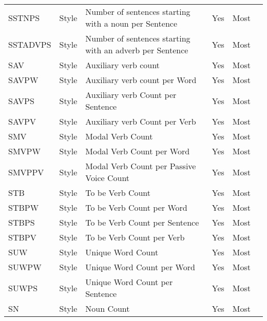 \begin{longtable}{l l m{} c c m{}}
    SSTNPS & Style & Number of sentences starting with a noun per Sentence & Yes & Most & \cite{Bassani2019_lr359} \\
    SSTADVPS & Style & Number of sentences starting with an adverb per Sentence & Yes & Most & \cite{Bassani2019_lr359} \\
    SAV & Style & Auxiliary verb count & Yes & Most & \cite{Dalip2009_lr14, Wang2020_lr26, Wang2019_lr74, Bassani2019_lr359, Dalip2016_lr1002, Dalip2011_lr1003, Dalip2014_lr1004, Olcer2022_lr2017, Magalhaes2019_lr2028} \\
    SAVPW & Style & Auxiliary verb count per Word & Yes & Most & \cite{Anderka2012_lr17, Ferretti2012_lr115, Pereyra2019_lr147, Bassani2019_lr359} \\
    SAVPS & Style & Auxiliary verb Count per Sentence & Yes & Most & \cite{Bassani2019_lr359} \\
    SAVPV & Style & Auxiliary verb Count per Verb & Yes & Most & \cite{Bassani2019_lr359} \\
    SMV & Style & Modal Verb Count & Yes & Most & \cite{} \\
    SMVPW & Style & Modal Verb Count per Word & Yes & Most & \cite{} \\
    SMVPPV & Style & Modal Verb Count per Passive Voice Count & Yes & Most & \cite{} \\
    STB & Style & To be Verb Count & Yes & Most & \cite{Bassani2019_lr359, Dalip2016_lr1002, Dalip2014_lr1004, Olcer2022_lr2017, Magalhaes2019_lr2028} \\
    STBPW & Style & To be Verb Count per Word & Yes & Most & \cite{Dalip2009_lr14, Anderka2012_lr17, Wang2020_lr26, Wang2019_lr74, Ferretti2012_lr115, Pereyra2019_lr147, Bassani2019_lr359, Dalip2011_lr1003} \\
    STBPS & Style & To be Verb Count per Sentence & Yes & Most & \cite{Bassani2019_lr359} \\
    STBPV & Style & To be Verb Count per Verb & Yes & Most & \cite{Bassani2019_lr359} \\
    SUW & Style & Unique Word Count & Yes & Most & \cite{Lewoniewski2018_lr149, Robertie2017_lr172, Bassani2019_lr359} \\
    SUWPW & Style & Unique Word Count per Word & Yes & Most & \cite{Xu2011_lr30, Su2015_lr128, Bassani2019_lr359} \\
    SUWPS & Style & Unique Word Count per Sentence & Yes & Most & \cite{Xu2011_lr30, Bassani2019_lr359} \\
    SN & Style & Noun Count & Yes & Most & \cite{Bassani2019_lr359, Olcer2022_lr2017} \\

\end{longtable}
